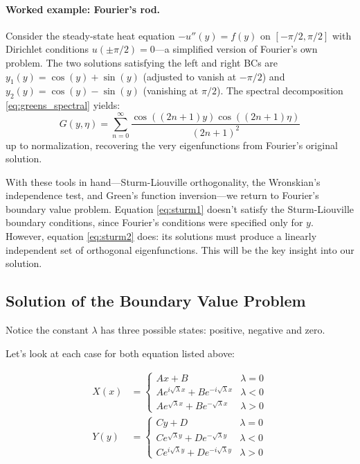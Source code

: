 \documentclass[12pt,a4paper]{report}
\theoremstyle{thms}
\theoremstyle{defns}
\begin{document}
\paragraph{Worked example: Fourier's rod.} Consider the steady-state heat equation $-u''(y) = f(y)$ on $[-\pi/2, \pi/2]$ with Dirichlet conditions $u(\pm\pi/2) = 0$—a simplified version of Fourier's own problem. The two solutions satisfying the left and right BCs are $y_1(y) = \cos(y) + \sin(y)$ (adjusted to vanish at $-\pi/2$) and $y_2(y) = \cos(y) - \sin(y)$ (vanishing at $\pi/2$). The spectral decomposition \eqref{eq:greens_spectral} yields:
\begin{equation}
    G(y, \eta) = \sum_{n=0}^{\infty} \dfrac{\cos((2n+1)y)\cos((2n+1)\eta)}{(2n+1)^2}
\end{equation}
up to normalization, recovering the very eigenfunctions from Fourier's original solution.

With these tools in hand—Sturm-Liouville orthogonality, the Wronskian's independence test, and Green's function inversion—we return to Fourier's boundary value problem. Equation \eqref{eq:sturm1} doesn't satisfy the Sturm-Liouville boundary conditions, since Fourier's conditions were specified only for $y$. However, equation \eqref{eq:sturm2} does: its solutions must produce a linearly independent set of orthogonal eigenfunctions. This will be the key insight into our solution.

\subsection{Solution of the Boundary Value Problem}
Notice the constant $\lambda$ has three possible states: positive, negative and zero.

Let's look at each case for both equation listed above:

\begin{align}
    X(x) & = \begin{cases}
        Ax + B                                         & \lambda = 0 \\
        Ae^{i\sqrt{\lambda}x} + Be^{-i\sqrt{\lambda}x} & \lambda < 0 \\
        Ae^{\sqrt{\lambda}x} + Be^{-\sqrt{\lambda}x}   & \lambda > 0
    \end{cases} \\
    Y(y) & = \begin{cases}
        Cy + D                                         & \lambda = 0 \\
        Ce^{\sqrt{\lambda}y} + De^{-\sqrt{\lambda}y}   & \lambda < 0 \\
        Ce^{i\sqrt{\lambda}y} + De^{-i\sqrt{\lambda}y} & \lambda > 0
    \end{cases}
\end{align}
\end{document}
